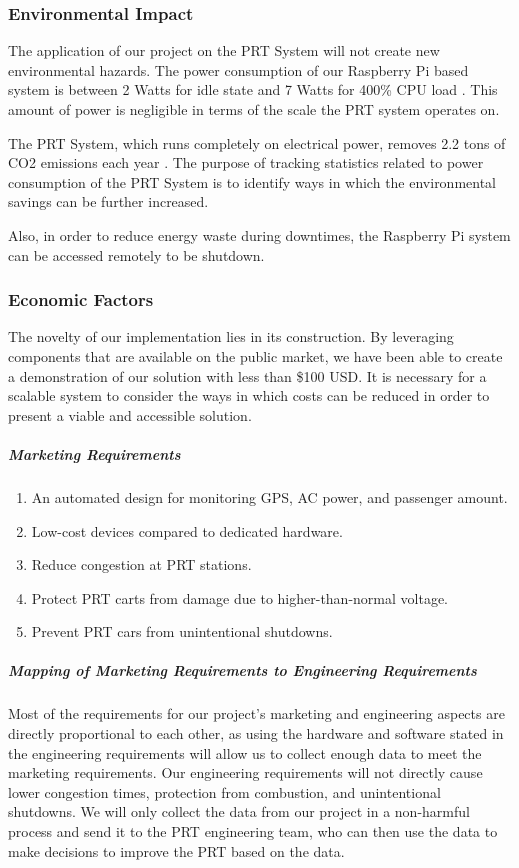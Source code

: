 \subsubsection{Environmental Impact}
The application of our project on the PRT System will not create new environmental hazards. 
The power consumption of our Raspberry Pi based system is between 2 Watts for idle state and 7 Watts for 400\% CPU load \cite{pidramblePowerConsumption}. 
This amount of power is negligible in terms of the scale the PRT system operates on. 

The PRT System, which runs completely on electrical power, removes 2.2 tons of CO2 emissions each year \cite{wvuPersonalRapid}. 
The purpose of tracking statistics related to power consumption of the PRT System is to identify ways in which the environmental savings can be further increased. 

Also, in order to reduce energy waste during downtimes, the Raspberry Pi system can be accessed remotely to be shutdown.

\subsubsection{Economic Factors}
The novelty of our implementation lies in its construction. 
By leveraging components that are available on the public market, we have been able to create a demonstration of our solution with less than \$100 USD. 
It is necessary for a scalable system to consider the ways in which costs can be reduced in order to present a viable and accessible solution.

\subparagraph{Marketing Requirements}
\begin{enumerate}
    \item An automated design for monitoring GPS, AC power, and passenger amount.
    \item Low-cost devices compared to dedicated hardware.
    \item Reduce congestion at PRT stations.
    \item Protect PRT carts from damage due to higher-than-normal voltage.
    \item Prevent PRT cars from unintentional shutdowns.
\end{enumerate}

\subparagraph{Mapping of Marketing Requirements to Engineering Requirements}
Most of the requirements for our project's marketing and engineering aspects are directly proportional to each other, as using the hardware and software stated in the engineering requirements will allow us to collect enough data to meet the marketing requirements. 
Our engineering requirements will not directly cause lower congestion times, protection from combustion, and unintentional shutdowns. 
We will only collect the data from our project in a non-harmful process and send it to the PRT engineering team, who can then use the data to make decisions to improve the PRT based on the data.


